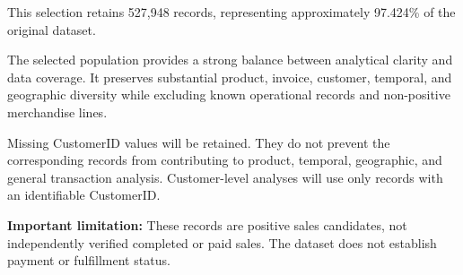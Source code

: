 \documentclass[11pt]{article}
\begin{document}
This selection retains 527,948 records, representing approximately
97.424\% of the original dataset.

The selected population provides a strong balance between analytical
clarity and data coverage. It preserves substantial product, invoice,
customer, temporal, and geographic diversity while excluding known
operational records and non-positive merchandise lines.

Missing CustomerID values will be retained. They do not prevent the
corresponding records from contributing to product, temporal,
geographic, and general transaction analysis. Customer-level analyses
will use only records with an identifiable CustomerID.

\textbf{Important limitation:} These records are positive sales
candidates, not independently verified completed or paid sales. The
dataset does not establish payment or fulfillment status.
\end{document}
